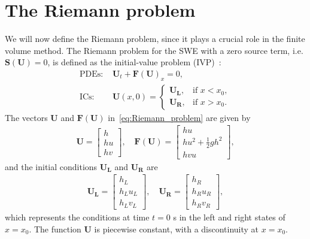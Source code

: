 \section{The Riemann problem}
We will now define the Riemann problem, since it plays a crucial role in the finite volume method.
The Riemann problem for the SWE with a zero source term, i.e. $\mathbf{S(U)} = 0$, is defined as the initial-value problem (IVP)~\cite{Toro2024}:
\begin{equation}\label{eq:Riemann_problem}
    \begin{aligned}
        \text{PDEs: } &\mathbf{U}_t + {\mathbf{F(U)}}_x = 0, \\
        \text{ICs: } &\mathbf{U}(x, 0) = \begin{cases}
            \mathbf{U_L}, & \text{if  } x < x_0, \\
            \mathbf{U_R}, & \text{if  } x > x_0.
        \end{cases}
    \end{aligned}
    \end{equation}
The vectors $\mathbf{U}$ and $\mathbf{F(U)}$ in~\eqref{eq:Riemann_problem} are given by
\begin{align}
    \mathbf{U} = \begin{bmatrix}
        h \\ hu \\ hv
    \end{bmatrix}, \quad
    \mathbf{F(U)} = \begin{bmatrix}
        hu \\ hu^2 + \frac{1}{2}gh^2 \\ hvu
    \end{bmatrix},
\end{align}
and the initial conditions $\mathbf{U_L}$ and $\mathbf{U_R}$ are
\begin{align*}
    \mathbf{U_L} = \begin{bmatrix}
        h_L \\ h_L u_L \\ h_L v_L
    \end{bmatrix}, \quad 
    \mathbf{U_R} = \begin{bmatrix}
        h_R \\ h_R u_R \\ h_R v_R
    \end{bmatrix},
\end{align*}
which represents the conditions at time $t = 0$ s in the left and right states of $x = x_0$.
The function $\mathbf{U}$ is piecewise constant, with a discontinuity at $x = x_0$.
